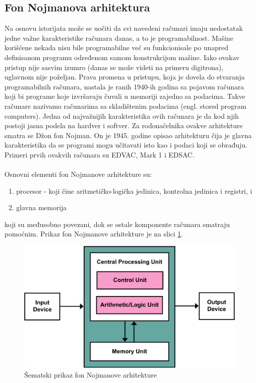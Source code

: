 \documentclass[a4paper]{article}
\begin{document}
\subsection{Fon Nojmanova arhitektura}
\label{sec:fN}
Na osnovu istorijata može se uočiti da svi navedeni računari imaju nedostatak jedne važne karakteristike računara danas, a to je programabilnost. Mašine korišćene nekada nisu bile programabilne već su funkcionisale po unapred definisanom programu određenom samom konstrukcijom mašine. Iako ovakav pristup nije sasvim izumro (danas se može videti na primeru digitrona), uglavnom nije poželjan. Prava promena u pristupu, koja je dovela do stvaranja programabilnih računara, nastala je ranih 1940-ih godina sa pojavom računara koji bi programe koje izvršavaju čuvali u memoriji zajedno sa podacima. Takve računare nazivamo računarima sa skladištenim podacima (engl. stored program computers). Jedna od najvažnijih karakteristika ovih računara je da kod njih postoji jasna podela na hardver i softver. Za rodonačelnika ovakve arhitekture smatra se Džon fon Nojman. On je 1945. godine opisao arhitekturu čija je glavna karakteristika da se programi mogu učitavati isto kao i podaci koji se obrađuju. Primeri prvih ovakvih računara su EDVAC, Mark 1 i EDSAC.\\\\
Osnovni elementi fon Nojmanove arhitekture su:
\begin{enumerate}
\item procesor - koji čine aritmetičko-logička jedinica, kontrolna jedinica i registri, i 
\item glavna memorija 
\end{enumerate}
koji su međusobno povezani, dok se ostale komponente računara smatraju pomoćnim. Prikaz fon Nojmanove arhitekture je na slici \ref{fig:fonN}.
\begin{figure}[h!]
\begin{center}
\includegraphics[scale=0.25]{pictures/fonN.png}
\end{center}
\caption{Šematski prikaz fon Nojmanove arhitekture}
\label{fig:fonN}
\end{figure}
\end{document}
